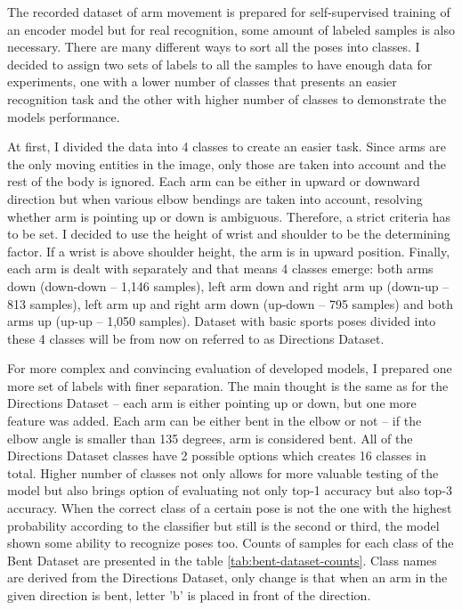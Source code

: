 The recorded dataset of arm movement is prepared for self-supervised training of an encoder model but for real recognition, some amount of labeled samples is also necessary. There are many different ways to sort all the poses into classes. I decided to assign two sets of labels to all the samples to have enough data for experiments, one with a lower number of classes that presents an easier recognition task and the other with higher number of classes to demonstrate the models performance.

At first, I divided the data into 4 classes to create an easier task. Since arms are the only moving entities in the image, only those are taken into account and the rest of the body is ignored. Each arm can be either in upward or downward direction but when various elbow bendings are taken into account, resolving whether arm is pointing up or down is ambiguous. Therefore, a strict criteria has to be set. I decided to use the height of wrist and shoulder to be the determining factor. If a wrist is above shoulder height, the arm is in upward position. Finally, each arm is dealt with separately and that means 4 classes emerge: both arms down (down-down -- 1,146 samples), left arm down and right arm up (down-up -- 813 samples), left arm up and right arm down (up-down -- 795 samples) and both arms up (up-up -- 1,050 samples). Dataset with basic sports poses divided into these 4 classes will be from now on referred to as Directions Dataset.

For more complex and convincing evaluation of developed models, I prepared one more set of labels with finer separation. The main thought is the same as for the Directions Dataset -- each arm is either pointing up or down, but one more feature was added. Each arm can be either bent in the elbow or not -- if the elbow angle is smaller than 135 degrees, arm is considered bent. All of the Directions Dataset classes have 2 possible options which creates 16 classes in total. Higher number of classes not only allows for more valuable testing of the model but also brings option of evaluating not only top-1 accuracy but also top-3 accuracy. When the correct class of a certain pose is not the one with the highest probability according to the classifier but still is the second or third, the model shown some ability to recognize poses too. Counts of samples for each class of the Bent Dataset are presented in the table \ref{tab:bent-dataset-counts}. Class names are derived from the Directions Dataset, only change is that when an arm in the given direction is bent, letter 'b' is placed in front of the direction.

